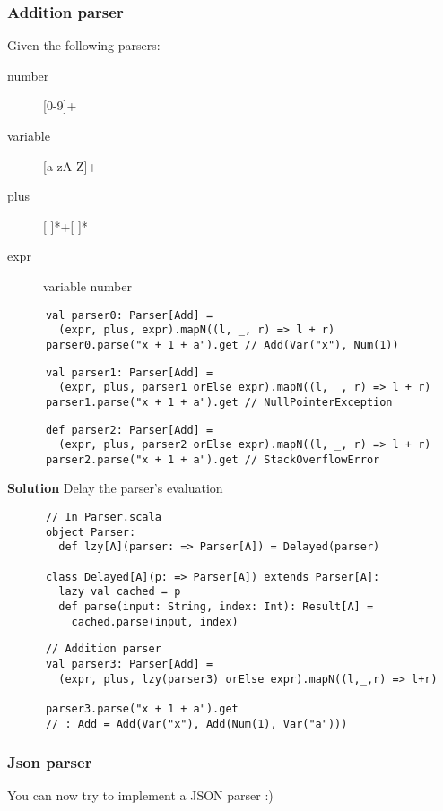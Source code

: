 \begin{frame}[fragile]
  \frametitle{Addition parser}
  \begin{overprint}
    Given the following parsers:
  
    \begin{multicols}{2}
      \begin{description}
        \item[number] [0-9]+
        \item[variable] [a-zA-Z]+
        \item[plus] [ ]*+[ ]*
        \item[expr] variable \textbar{} number
      \end{description}
    \end{multicols}
    \begin{lstlisting}
      val parser0: Parser[Add] =
        (expr, plus, expr).mapN((l, _, r) => l + r)
      parser0.parse("x + 1 + a").get // Add(Var("x"), Num(1))
    \end{lstlisting}
    \begin{lstlisting}
      val parser1: Parser[Add] =
        (expr, plus, parser1 orElse expr).mapN((l, _, r) => l + r)
      parser1.parse("x + 1 + a").get // NullPointerException
    \end{lstlisting}
    \begin{lstlisting}
      def parser2: Parser[Add] =
        (expr, plus, parser2 orElse expr).mapN((l, _, r) => l + r)
      parser2.parse("x + 1 + a").get // StackOverflowError
    \end{lstlisting}
    \textbf{Solution} Delay the parser's evaluation
    \begin{lstlisting}
      // In Parser.scala
      object Parser:
        def lzy[A](parser: => Parser[A]) = Delayed(parser)

      class Delayed[A](p: => Parser[A]) extends Parser[A]:
        lazy val cached = p
        def parse(input: String, index: Int): Result[A] =
          cached.parse(input, index)
    \end{lstlisting}
    \begin{lstlisting}
      // Addition parser
      val parser3: Parser[Add] =
        (expr, plus, lzy(parser3) orElse expr).mapN((l,_,r) => l+r)

      parser3.parse("x + 1 + a").get
      // : Add = Add(Var("x"), Add(Num(1), Var("a")))
    \end{lstlisting}
  \end{overprint}
\end{frame}

\begin{frame}
  \frametitle{Json parser}

  You can now try to implement a JSON parser :)

\end{frame}